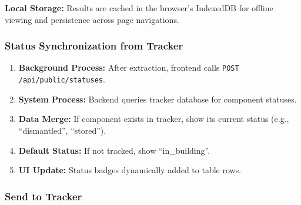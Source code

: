 \documentclass[11pt,a4paper]{article}
\begin{document}
\vspace{0.5cm}

\noindent\textbf{Local Storage:} Results are cached in the browser's IndexedDB for offline viewing and persistence across page navigations.

\subsubsection{Status Synchronization from Tracker}

\begin{enumerate}[leftmargin=*]
    \item \textbf{Background Process:} After extraction, frontend calls \texttt{POST /api/public/statuses}.
    \item \textbf{System Process:} Backend queries tracker database for component statuses.
    \item \textbf{Data Merge:} If component exists in tracker, show its current status (e.g., ``dismantled'', ``stored'').
    \item \textbf{Default Status:} If not tracked, show ``in\_building''.
    \item \textbf{UI Update:} Status badges dynamically added to table rows.
\end{enumerate}

\subsubsection{Send to Tracker}
\end{document}
